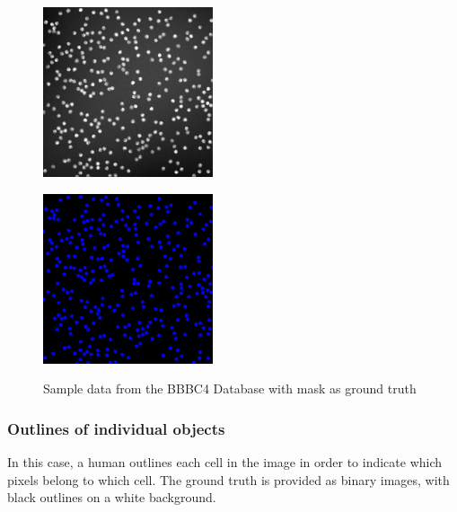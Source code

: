 \begin{figure}[H]
\begin{minipage}[c]{0.4\linewidth}
\centering
\includegraphics[width=50mm]{../images/BBBC4-1.jpg}
\label{fig:BBBC004_img}
\end{minipage}
\hfill
\begin{minipage}[c]{0.4\linewidth}
\centering
\includegraphics[width=50mm]{../images/BBBC4-1-F.jpg}
\label{fig:BBBC004_F}
\end{minipage}
\caption{Sample data from the BBBC4 Database with mask as ground truth}
\end{figure}

\subsubsection{Outlines of individual objects}
\hspace{\parindent}
In this case, a human outlines each cell in the image in order to indicate which pixels belong to which cell. The ground truth is provided as binary images, with black outlines on a white background.

